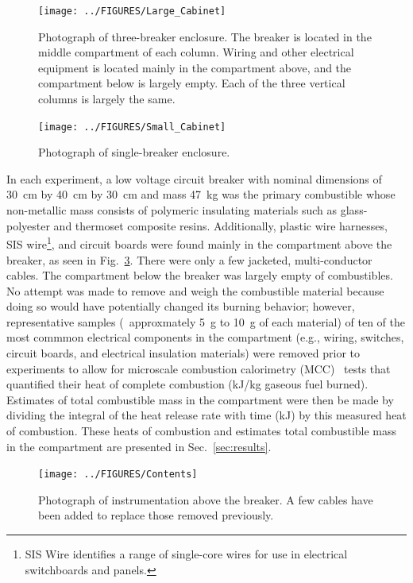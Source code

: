 \documentclass[12pt]{article}
\begin{document}
\begin{figure}[ht]
\centering
\texttt{[image: ../FIGURES/Large\_Cabinet]}
\caption[Photograph of three-breaker enclosure] {Photograph of three-breaker enclosure. The breaker is located in the middle compartment of each column. Wiring and other electrical equipment is located mainly in the compartment above, and the compartment below is largely empty. Each of the three vertical columns is largely the same.}
\label{fig:Cabinet_1}
\end{figure}

\begin{figure}[ht]
\centering
\texttt{[image: ../FIGURES/Small\_Cabinet]}
\caption[Photograph of single-breaker enclosure] {Photograph of single-breaker enclosure.}
\label{fig:Cabinet_2}
\end{figure}

In each experiment, a low voltage circuit breaker with nominal dimensions of 30~cm by 40~cm by 30~cm and mass 47~kg was the primary combustible whose non-metallic mass consists of polymeric insulating materials such as glass-polyester and thermoset composite resins. Additionally, plastic wire harnesses, SIS wire\footnote{SIS Wire identifies a range of single-core wires for use in electrical switchboards and panels.}, and circuit boards were found mainly in the compartment above the breaker, as seen in Fig.~\ref{fig:Contents}. There were only a few jacketed, multi-conductor cables. The compartment below the breaker was largely empty of combustibles. No attempt was made to remove and weigh the combustible material because doing so would have potentially changed its burning behavior; however, representative samples (~approxmately 5~g to 10~g of each material) of ten of the most commmon electrical components in the compartment (e.g., wiring, switches, circuit boards, and electrical insulation materials) were removed prior to experiments to allow for microscale combustion calorimetry (MCC)~\cite{ASTM_D7309} tests that quantified their heat of complete combustion (kJ/kg gaseous fuel burned). Estimates of total combustible mass in the compartment were then be made by dividing the integral of the heat release rate with time (kJ) by this measured heat of combustion. These heats of combustion and estimates total combustible mass in the compartment are presented in Sec.~\ref{sec:results}.

\begin{figure}[ht]
\centering
\texttt{[image: ../FIGURES/Contents]}
\caption[Photograph of instrumentation above the breaker] {Photograph of instrumentation above the breaker. A few cables have been added to replace those removed previously.}
\label{fig:Contents}
\end{figure}
\end{document}
